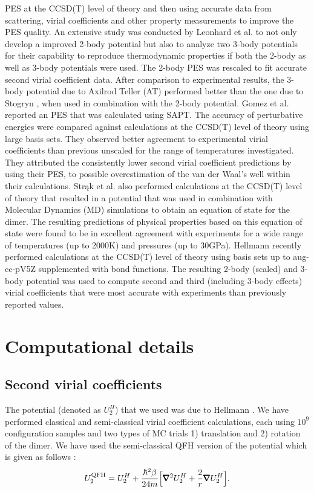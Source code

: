 \abinitio{} PES at the CCSD(T) level of theory and then using accurate data from scattering, virial coefficients and other property measurements to improve the PES quality. An extensive \abinitio{} study was conducted by Leonhard et al. \cite{Leonhard2002} to not only develop a improved 2-body potential but also to analyze two 3-body potentials for their capability to reproduce thermodynamic properties if both the 2-body as well as 3-body potentials were used. The 2-body \abinitio{} PES was rescaled to fit accurate second virial coefficient data. After comparison to experimental results, the 3-body potential due to Axilrod Teller (AT) \cite{Axilrod1943} performed better than the one due to Stogryn \cite{Stogryn1969}, when used in combination with the 2-body potential. Gomez et al. \cite{Gomez2007} reported an \abinitio{} PES that was calculated using SAPT. The accuracy of perturbative energies were compared against calculations at the CCSD(T) level of theory using large basis sets. They observed better agreement to experimental virial coefficients than previous unscaled \PESs{} for the range of temperatures investigated. They attributed the consistently lower second virial coefficient predictions by using their PES, to possible overestimation of the van der Waal's well within their calculations. Str\k{a}k et al. \cite{Strak2007} also performed \abinitio{} calculations at the CCSD(T) level of theory that resulted in a potential that was used in combination with Molecular Dynamics (MD) simulations to obtain an equation of state for the dimer. The resulting predictions of physical properties based on this equation of state were found to be in excellent agreement with experiments for a wide range of temperatures (up to 2000K) and pressures (up to 30GPa). Hellmann \cite{Hellmann2013} recently performed \abinitio{} calculations at the CCSD(T) level of theory using basis sets up to aug-cc-pV5Z supplemented with bond functions. The resulting 2-body (scaled) and 3-body potential was used to compute second and third (including 3-body effects) virial coefficients that were most accurate with experiments than previously reported values.
\section{Computational details}
    \subsection{Second virial coefficients}
    \label{subsubsec:b2n2}
        The \abinitio{} potential (denoted as $U_2^H$) that we used was due to Hellmann \cite{Hellmann2013}. We have performed classical and semi-classical virial coefficient calculations, each using $10^9$ configuration samples and two types of MC trials 1) translation and 2) rotation of the dimer. We have used the semi-classical QFH version of the potential which is given as follows \cite{Feynman,Schenter2002}:
        \begin{equation}
        \label{eq:QFH}
            U_2^{\rm QFH} = U_2^H + \displaystyle\frac{\hbar^2 \beta}{24 m} \Big[ \pmb{\nabla}^2 U_2^H + \frac{2}{r} \pmb{\nabla} U_2^H \Big].
        \end{equation}

